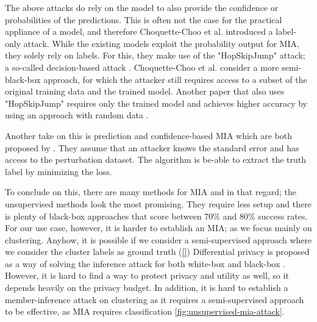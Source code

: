 The above attacks do rely on the model to also provide the confidence or probabilities of the predictions.
This is often not the case for the practical appliance of a model, and therefore Choquette-Choo et al. introduced a label-only attack.
While the existing models exploit the probability output for MIA, they solely rely on labels.
For this, they make use of the "HopSkipJump" attack; a so-called decision-based attack \citep{chen_hopskipjumpattack_2020}.
Choquette-Choo et al. consider a more semi-black-box approach, for which the attacker still requires access to a subset of the original training data and the trained model.
Another paper that also uses "HopSkipJump" requires only the trained model and achieves higher accuracy by using an approach with random data \citep{li_membership_2021}.

Another take on this is prediction and confidence-based MIA which are both proposed by \citep{yeom_privacy_2018}.
They assume that an attacker knows the standard error and has access to the perturbation dataset.
The algorithm is be-able to extract the truth label by minimizing the loss. \newline

To conclude on this, there are many methods for MIA and in that regard; the unsupervised methods look the most promising.
They require less setup and there is plenty of black-box approaches that score between 70\% and 80\% success rates.
For our use case, however, it is harder to establish an MIA; as we focus mainly on clustering.
Anyhow, it is possible if we consider a semi-supervised approach where we consider the cluster labels as ground truth (\ref{})
Differential privacy is proposed as a way of solving the inference attack for both white-box and black-box \citep{hu_membership_2022}.
However, it is hard to find a way to protect privacy and utility as well, so it depends heavily on the privacy budget.
In addition, it is hard to establish a member-inference attack on clustering as it requires a semi-supervised approach to be effective, as MIA requires classification \ref{fig:unsupervised-mia-attack}.




